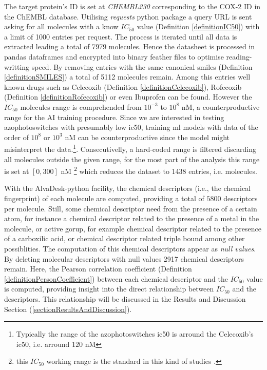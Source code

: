 \documentclass[11pt]{article}
\begin{document}
The target protein's ID is set at \emph{CHEMBL230} corresponding to the COX-2 ID in the ChEMBL database\cite{ChemblDatabase}. Utilising \emph{requests} python package\cite{PythonPackageRequests} a query URL is sent asking for all molecules with a know $IC_{50}$ value (Definition \ref{definitionIC50}) with a limit of 1000 entries per request. The process is iterated until all data is extracted leading a total of 7979 molecules. Hence the datasheet is processed in pandas dataframes\cite{PythonPackagePandas} and encrypted into binary feather files to optimise reading-writting speed. By removing entries with the same canonical \gls{smiles} (Definition \ref{definitionSMILES})  a total of 5112 molecules remain. Among this entries well known drugs such as Celecoxib (Definition \ref{definitionCelecoxib}), Rofecoxib (Definition \ref{definitionRofecoxib}) or even Ibuprofen can be found. However the $IC_{50}$ molecules range is comprehended from $10^{-3}$ to $10^{8}$ nM, a counterproductive range for the AI training procedure. Since we are interested in testing azophotoswitches with presumably low \gls{ic50}, training \gls{ml} models with data of the order of $10^{8}$ or $10^{3}$ nM can be counterproductive since the model might misinterpret the data.\footnote{Typically the range of the azophotoswitches \gls{ic50} is arround the Celecoxib's \gls{ic50}, i.e. arround $120$ nM}. Consecutivelly, a hard-coded range is filtered discarding all molecules outside the given range, for the most part of the analysis this range is set at $[0,300]$ nM \footnote{this $IC_{50}$ working range is the standard in this kind of studies \cite{MachineLearningPaper5Lipoxygenase}.} which reduces the dataset to 1438 entries, i.e. molecules.

With the AlvaDesk-python \cite{AlvaDescSecondPaper} facility, the chemical descriptors (i.e., the chemical fingerprint) of each molecule are computed, providing a total of $5800$ descriptors per molecule. Still, some chemical descriptor need from the presence of a certain atom, for instance a chemical descriptor related to the presence of a metal in the molecule, or active gorup, for example chemical descriptor related to the presence of a carboxilic acid, or chemical descriptor related triple bound among other possiblities. The computation of this chemical descriptors appear as \emph{null values}. By deleting molecular descriptors with null values 2917 chemical descriptors remain. Here, the Pearson correlation coefficient (Definition \ref{definitionPersonCoefficient}) between each chemical descriptor and the $IC_{50}$ value is computed, providing insight into the direct relationship between $IC_{50}$ and the descriptors. This relationship will be discussed in the Results and Discussion Section (\ref{sectionResultsAndDiscussion}).
\end{document}
